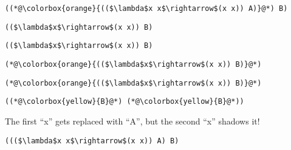 \documentclass{beamer}
\begin{document}
\begin{frame}[fragile]{\CurrentSection}
\lstset{basicstyle=\ttfamily\small}\lstset{numbers=none}\lstset{language=ML}\begin{lstlisting}
((*@\colorbox{orange}{(($\lambda$x x$\rightarrow$(x x)) A)}@*) B)
\end{lstlisting}
\pause\lstset{language=ML}\begin{lstlisting}
(($\lambda$x$\rightarrow$(x x)) B)
\end{lstlisting}

\end{frame}

\begin{frame}[fragile]{\CurrentSection}
\lstset{basicstyle=\ttfamily\small}\lstset{numbers=none}\lstset{language=ML}\begin{lstlisting}
(($\lambda$x$\rightarrow$(x x)) B)
\end{lstlisting}
\pause\lstset{language=ML}\begin{lstlisting}
(*@\colorbox{orange}{(($\lambda$x$\rightarrow$(x x)) B)}@*)
\end{lstlisting}

\end{frame}

\begin{frame}[fragile]{\CurrentSection}
\lstset{basicstyle=\ttfamily\small}\lstset{numbers=none}\lstset{language=ML}\begin{lstlisting}
(*@\colorbox{orange}{(($\lambda$x$\rightarrow$(x x)) B)}@*)
\end{lstlisting}
\pause\lstset{language=ML}\begin{lstlisting}
((*@\colorbox{yellow}{B}@*) (*@\colorbox{yellow}{B}@*))
\end{lstlisting}

\end{frame}

\begin{frame}[fragile]{\CurrentSection}
\begin{exampleblock}{}
The first ``x'' gets replaced with ``A'', but the second ``x'' shadows it!
\end{exampleblock}

 
\lstset{basicstyle=\ttfamily\small}\lstset{numbers=none}\lstset{language=ML}\begin{lstlisting}
((($\lambda$x x$\rightarrow$(x x)) A) B)
\end{lstlisting}
 

\end{frame}
\end{document}
